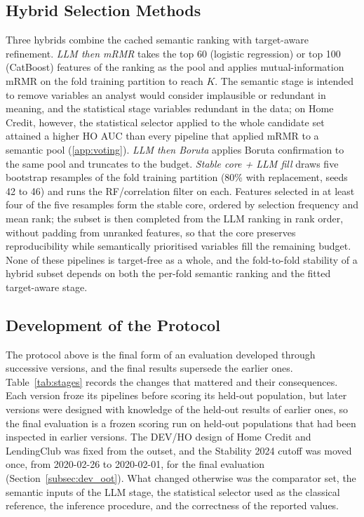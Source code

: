 \documentclass[final,5p,twocolumn]{elsarticle}
\newcommand{\Kfeat}{K}
\begin{document}
\subsection{Hybrid Selection Methods}
\label{subsec:hybrid_fs}

Three hybrids combine the cached semantic ranking with target-aware refinement. \emph{LLM then mRMR} takes the top 60 (logistic regression) or top 100 (CatBoost) features of the ranking as the pool and applies mutual-information mRMR on the fold training partition to reach $\Kfeat$. The semantic stage is intended to remove variables an analyst would consider implausible or redundant in meaning, and the statistical stage variables redundant in the data; on Home Credit, however, the statistical selector applied to the whole candidate set attained a higher HO AUC than every pipeline that applied mRMR to a semantic pool (\ref{app:voting}). \emph{LLM then Boruta} applies Boruta confirmation to the same pool and truncates to the budget. \emph{Stable core + LLM fill} draws five bootstrap resamples of the fold training partition (80\% with replacement, seeds 42 to 46) and runs the RF/correlation filter on each. Features selected in at least four of the five resamples form the stable core, ordered by selection frequency and mean rank; the subset is then completed from the LLM ranking in rank order, without padding from unranked features, so that the core preserves reproducibility while semantically prioritised variables fill the remaining budget. None of these pipelines is target-free as a whole, and the fold-to-fold stability of a hybrid subset depends on both the per-fold semantic ranking and the fitted target-aware stage.

\subsection{Development of the Protocol}
\label{subsec:protocol_development}

The protocol above is the final form of an evaluation developed through successive versions, and the final results supersede the earlier ones. Table~\ref{tab:stages} records the changes that mattered and their consequences. Each version froze its pipelines before scoring its held-out population, but later versions were designed with knowledge of the held-out results of earlier ones, so the final evaluation is a frozen scoring run on held-out populations that had been inspected in earlier versions. The DEV/HO design of Home Credit and LendingClub was fixed from the outset, and the Stability 2024 cutoff was moved once, from 2020-02-26 to 2020-02-01, for the final evaluation (Section~\ref{subsec:dev_oot}). What changed otherwise was the comparator set, the semantic inputs of the LLM stage, the statistical selector used as the classical reference, the inference procedure, and the correctness of the reported values.
\end{document}
